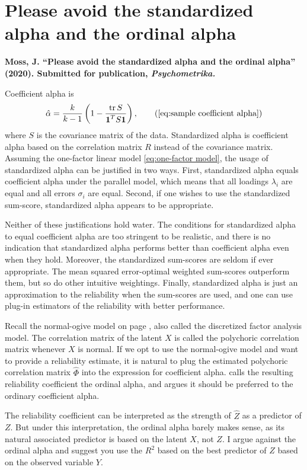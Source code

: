 \section{Please avoid the standardized alpha and the ordinal alpha}
\textbf{Moss, J. ``Please avoid the standardized alpha and the ordinal alpha''
(2020). Submitted for publication, \emph{Psychometrika.}}

Coefficient alpha is
\begin{equation}
\hat{\alpha}=\frac{k}{k-1}\left(1-\frac{\tr{S}}{\boldsymbol{1}^{T}S\boldsymbol{1}}\right),\tag{\ref{eq:sample coefficient alpha}}
\end{equation}
where $S$ is the covariance matrix of the data. Standardized alpha is coefficient alpha based on the correlation matrix $R$ instead of the covariance matrix. Assuming the one-factor linear model \eqref{eq:one-factor model}, the usage of standardized alpha can be justified in two ways. First, standardized alpha equals coefficient alpha under the parallel model, which means that all loadings $\lambda_i$ are equal and all errors $\sigma_i$ are equal. Second, if one wishes to use the standardized sum-score, standardized alpha appears to be appropriate.

Neither of these justifications hold water. The conditions for standardized alpha to equal coefficient alpha are too stringent to be realistic, and there is no indication that standardized alpha performs better than coefficient alpha even when they hold. Moreover, the standardized sum-scores are seldom if ever appropriate. The mean squared error-optimal weighted sum-scores outperform them, but so do other intuitive weightings. Finally, standardized alpha is just an approximation to the reliability when the sum-scores are used, and one can use plug-in estimators of the reliability with better performance.

Recall the normal-ogive model on page \pageref{eq:discretization model}, also called the discretized factor analysis model. The correlation matrix of the latent $X$ is called the polychoric correlation matrix whenever $X$ is normal. If we opt to use the normal-ogive model and want to provide a reliability estimate, it is natural to plug the estimated polychoric correlation matrix $\hat{\Phi}$ into the expression for coefficient alpha. \textcite{Zumbo2007-ap} calls the resulting reliability coefficient the ordinal alpha, and argues it should be preferred to the ordinary coefficient alpha. 

The reliability coefficient can be interpreted as the strength of $\hat{Z}$ as a predictor of $Z$. But under this interpretation, the ordinal alpha barely makes sense, as its natural associated predictor is based on the latent $X$, not $Z$. I argue against the ordinal alpha and suggest you use the $R^2$ based on the best predictor of $Z$ based on the observed variable $Y$. 

